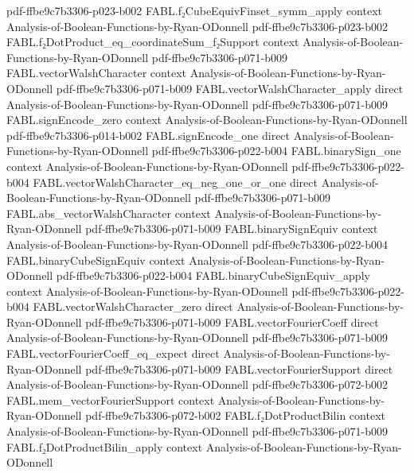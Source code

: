 \begin{theorem}
  {pdf-ffbe9c7b3306-p023-b002}
\proofstep
  {FABL.f₂CubeEquivFinset_symm_apply}
  {context}
  {Analysis-of-Boolean-Functions-by-Ryan-ODonnell}
  {pdf-ffbe9c7b3306-p023-b002}
\proofstep
  {FABL.f₂DotProduct_eq_coordinateSum_f₂Support}
  {context}
  {Analysis-of-Boolean-Functions-by-Ryan-ODonnell}
  {pdf-ffbe9c7b3306-p071-b009}
\proofstep
  {FABL.vectorWalshCharacter}
  {context}
  {Analysis-of-Boolean-Functions-by-Ryan-ODonnell}
  {pdf-ffbe9c7b3306-p071-b009}
\proofstep
  {FABL.vectorWalshCharacter_apply}
  {direct}
  {Analysis-of-Boolean-Functions-by-Ryan-ODonnell}
  {pdf-ffbe9c7b3306-p071-b009}
\proofstep
  {FABL.signEncode_zero}
  {context}
  {Analysis-of-Boolean-Functions-by-Ryan-ODonnell}
  {pdf-ffbe9c7b3306-p014-b002}
\proofstep
  {FABL.signEncode_one}
  {direct}
  {Analysis-of-Boolean-Functions-by-Ryan-ODonnell}
  {pdf-ffbe9c7b3306-p022-b004}
\proofstep
  {FABL.binarySign_one}
  {context}
  {Analysis-of-Boolean-Functions-by-Ryan-ODonnell}
  {pdf-ffbe9c7b3306-p022-b004}
\proofstep
  {FABL.vectorWalshCharacter_eq_neg_one_or_one}
  {direct}
  {Analysis-of-Boolean-Functions-by-Ryan-ODonnell}
  {pdf-ffbe9c7b3306-p071-b009}
\proofstep
  {FABL.abs_vectorWalshCharacter}
  {context}
  {Analysis-of-Boolean-Functions-by-Ryan-ODonnell}
  {pdf-ffbe9c7b3306-p071-b009}
\proofstep
  {FABL.binarySignEquiv}
  {context}
  {Analysis-of-Boolean-Functions-by-Ryan-ODonnell}
  {pdf-ffbe9c7b3306-p022-b004}
\proofstep
  {FABL.binaryCubeSignEquiv}
  {context}
  {Analysis-of-Boolean-Functions-by-Ryan-ODonnell}
  {pdf-ffbe9c7b3306-p022-b004}
\proofstep
  {FABL.binaryCubeSignEquiv_apply}
  {context}
  {Analysis-of-Boolean-Functions-by-Ryan-ODonnell}
  {pdf-ffbe9c7b3306-p022-b004}
\proofstep
  {FABL.vectorWalshCharacter_zero}
  {direct}
  {Analysis-of-Boolean-Functions-by-Ryan-ODonnell}
  {pdf-ffbe9c7b3306-p071-b009}
\proofstep
  {FABL.vectorFourierCoeff}
  {direct}
  {Analysis-of-Boolean-Functions-by-Ryan-ODonnell}
  {pdf-ffbe9c7b3306-p071-b009}
\proofstep
  {FABL.vectorFourierCoeff_eq_expect}
  {direct}
  {Analysis-of-Boolean-Functions-by-Ryan-ODonnell}
  {pdf-ffbe9c7b3306-p071-b009}
\proofstep
  {FABL.vectorFourierSupport}
  {direct}
  {Analysis-of-Boolean-Functions-by-Ryan-ODonnell}
  {pdf-ffbe9c7b3306-p072-b002}
\proofstep
  {FABL.mem_vectorFourierSupport}
  {context}
  {Analysis-of-Boolean-Functions-by-Ryan-ODonnell}
  {pdf-ffbe9c7b3306-p072-b002}
\proofstep
  {FABL.f₂DotProductBilin}
  {context}
  {Analysis-of-Boolean-Functions-by-Ryan-ODonnell}
  {pdf-ffbe9c7b3306-p071-b009}
\proofstep
  {FABL.f₂DotProductBilin_apply}
  {context}
  {Analysis-of-Boolean-Functions-by-Ryan-ODonnell}

\end{theorem}
